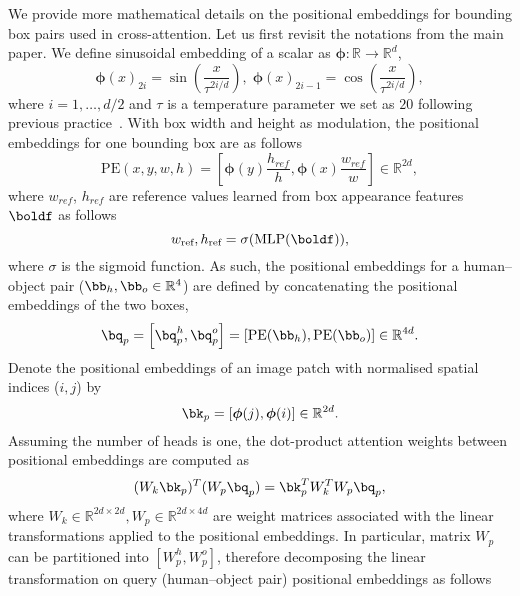 \documentclass[10pt,twocolumn,letterpaper]{article}
\begin{document}
We provide more mathematical details on the positional embeddings for bounding box pairs used in cross-attention. Let us first revisit the notations from the main paper. We define sinusoidal embedding of a scalar as $\boldsymbol{\phi}: \mathbb{R} \rightarrow \mathbb{R}^d$,
\begin{equation}
   \boldsymbol{\phi}(x)_{2i} = \sin\left(\frac{x}{\tau^{2i/d}}\right),\; \boldsymbol{\phi}(x)_{2i - 1} = \cos\left(\frac{x}{\tau^{2i/d}}\right),
\end{equation}
where $i=1,\ldots,d/2$ and $\tau$ is a temperature parameter we set as $20$ following previous practice~\cite{dab-detr}. With box width and height as modulation, the positional embeddings for one bounding box are as follows
\begin{equation}
   \text{PE}(x, y, w, h) = \left[ \boldsymbol{\phi}(y) \frac{h_{ref}}{h}, \boldsymbol{\phi}(x) \frac{w_{ref}}{w} \right] \in \mathbb{R}^{2d},
\end{equation}
where $w_{ref}$, $h_{ref}$ are reference values learned from box appearance features $\boldf$ as follows
\begin{equation}
   w_\text{ref}, h_\text{ref} = \sigma(\text{MLP}(\boldf)),
\end{equation}
where $\sigma$ is the sigmoid function. As such, the positional embeddings for a human--object pair ($\bb_h, \bb_o \in \mathbb{R}^4$) are defined by concatenating the positional embeddings of the two boxes,
\begin{equation}
   \bq_p = \left[ \bq_p^h, \bq_p^o \right] = \left[ \text{PE}(\bb_h), \text{PE}(\bb_o) \right] \in \mathbb{R}^{4d}.
\end{equation}
Denote the positional embeddings of an image patch with normalised spatial indices ($i, j$) by
\begin{equation}
   \bk_p = [\boldsymbol{\phi}(j), \boldsymbol{\phi}(i)] \in \mathbb{R}^{2d}.
\end{equation}
Assuming the number of heads is one, the dot-product attention weights between positional embeddings are computed as
\begin{equation}
   (W_k \bk_p)^T (W_p \bq_p ) = \bk_p^T W_k^T W_p \bq_p,
   \label{eq:dot-prod}
\end{equation}
where $W_k \in \mathbb{R}^{2d\times 2d}, W_p \in \mathbb{R}^{2d \times 4d}$ are weight matrices associated with the linear transformations applied to the positional embeddings. In particular, matrix $W_p$ can be partitioned into $\left[ W_p^h, W_p^o \right]$, therefore decomposing the linear transformation on query (human--object pair) positional embeddings as follows
\end{document}
